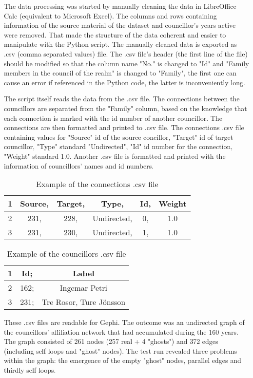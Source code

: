 The data processing was started by manually cleaning the data in LibreOffice Calc (equivalent to Microsoft Excel). The columns and rows containing information of the source material of the dataset and councillor's years active were removed. That made the structure of the data coherent and easier to manipulate with the Python script. The manually cleaned data is exported as .csv (comma separated values) file. The .csv file's header (the first line of the file) should be modified so that the column name "No." is changed to "Id" and "Family members in the council of the realm" is changed to "Family", the first one can cause an error if referenced in the Python code, the latter is inconveniently long.

The script itself reads the data from the .csv file. The connections between the councillors are separated from the "Family" column, based on the knowledge that each connection is marked with the id number of another councillor. The connections are then formatted and printed to .csv file. The connections .csv file containing values for "Source" id of the source concillor, "Target" id of target councillor, "Type" standard "Undirected", "Id" id number for the connection, "Weight" standard 1.0. Another .csv file is formatted and printed with the information of councillors' names and id numbers.

\begin{table}[h]
	\caption{Example of the connections .csv file}
	\centering
	\begin{tabular}{cccccc}
		\hline
		1 &Source, &Target, &Type, &Id, &Weight \\
		\hline
		2 &231, &228, &Undirected, &0, &1.0 \\
		\hline
		3 &231, &230, &Undirected, &1, &1.0 \\
		\hline
	\end{tabular}
\end{table}
\begin{table}[h]
	\caption{Example of the councillors .csv file}
	\centering
	\begin{tabular}{ccc}	
		\hline
		1 &Id; &Label \\
		\hline
		2 &162; &Ingemar Petri \\
		\hline
		3 &231; &Tre Rosor, Ture Jönsson \\
		\hline
	\end{tabular}
\end{table}

These .csv files are readable for Gephi. The outcome was an undirected graph of the councillors' affiliation network that had accumulated during the 160 years. The graph consisted of 261 nodes (257 real + 4 "ghosts") and 372 edges (including self loops and "ghost" nodes). The test run revealed three problems within the graph: the emergence of the empty "ghost" nodes, parallel edges and thirdly self loops. 

